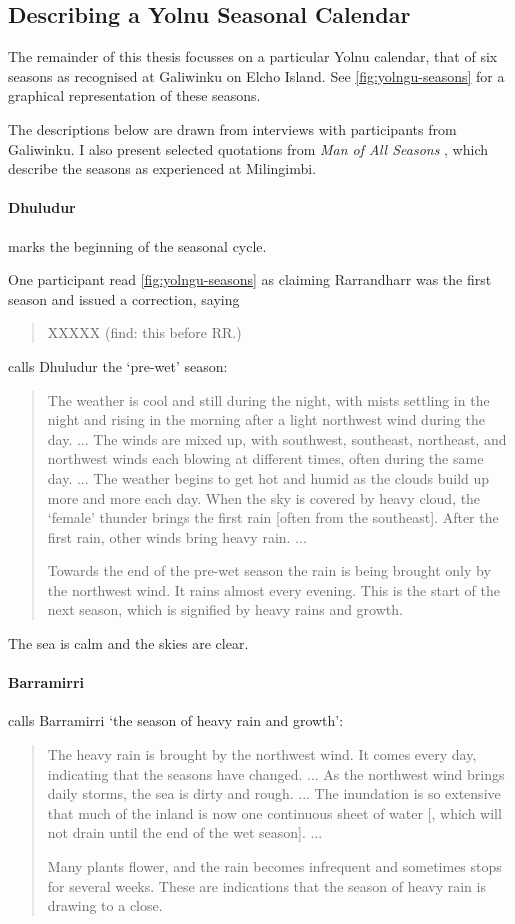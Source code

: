 \subsection{Describing a Yolnu Seasonal Calendar}
\label{subsec:calendar-description}

The remainder of this thesis focusses on a particular Yolnu calendar,
that of six seasons as recognised at Galiwinku on Elcho Island.
See \autoref{fig:yolngu-seasons} for a graphical representation of these seasons.

The descriptions below are drawn from interviews with participants from Galiwinku.
I also present selected quotations from \textit{Man of All Seasons} \citep{davis1989},
which describe the seasons as experienced at Milingimbi.


\paragraph{Dhuludur} marks the beginning of the seasonal cycle.

One participant read \autoref{fig:yolngu-seasons} as claiming Rarrandharr was the first season
and issued a correction, saying \blockquote{XXXXX (find: this before RR.)}.

\citet{davis1989} calls Dhuludur the `pre-wet' season:
\blockquote{
    The weather is cool and still during the night, with mists settling in the night
    and rising in the morning after a light northwest wind during the day. ...
    The winds are mixed up, with southwest, southeast, northeast, and northwest winds
    each blowing at different times, often during the same day. ...
    The weather begins to get hot and humid as the clouds build up more and more each day.
    When the sky is covered by heavy cloud, the `female' thunder brings the first rain [often from the southeast].
    After the first rain, other winds bring heavy rain. ...
    
    Towards the end of the pre-wet season the rain is being brought only by the northwest wind.
    It rains almost every evening.
    This is the start of the next season, which is signified by heavy rains and growth.
}

The sea is calm and the skies are clear.


\paragraph{Barramirri}

\citet{davis1989} calls Barramirri `the season of heavy rain and growth':
\blockquote{
    The heavy rain is brought by the northwest wind. It comes every day,
    indicating that the seasons have changed. ...
    As the northwest wind brings daily storms, the sea is dirty and rough. ...
    The inundation is so extensive that much of the inland is now one continuous sheet of water
    [, which will not drain until the end of the wet season]. ...
    
    Many plants flower, and the rain becomes infrequent and sometimes stops for several weeks.
    These are indications that the season of heavy rain is drawing to a close.
}


